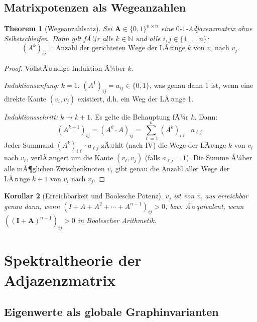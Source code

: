 ﻿\documentclass[12pt, a4paper]{article}
\newtheorem{theorem}{Theorem}[section]
\newtheorem{corollary}[theorem]{Korollar}
\theoremstyle{definition}
\theoremstyle{remark}
\newcommand{\N}{\mathbb{N}}
\newcommand{\vA}{\bm{A}}
\newcommand{\vI}{\bm{I}}
\begin{document}
\subsection{Matrixpotenzen als Wegeanzahlen}
\label{subsec:potenzen}

\begin{theorem}[Wegeanzahlsatz]
\label{thm:wege}
Sei $\vA \in \{0,1\}^{n \times n}$ eine $0$-$1$-Adjazenzmatrix ohne
Selbstschleifen. Dann gilt fÃ¼r alle $k \in \N$ und alle $i,j \in
\{1,\ldots,n\}$:
\[
  (A^k)_{ij} = \text{Anzahl der gerichteten Wege der LÃ¤nge } k
  \text{ von } v_i \text{ nach } v_j.
\]
\end{theorem}

\begin{proof}
VollstÃ¤ndige Induktion Ã¼ber $k$.

\emph{Induktionsanfang:} $k=1$. $(A^1)_{ij} = a_{ij} \in \{0,1\}$, was
genau dann $1$ ist, wenn eine direkte Kante $(v_i, v_j)$ existiert, d.h.
ein Weg der LÃ¤nge 1.

\emph{Induktionsschritt:} $k \to k+1$. Es gelte die Behauptung fÃ¼r $k$.
Dann:
\[
  (A^{k+1})_{ij} = (A^k \cdot A)_{ij} = \sum_{\ell=1}^n (A^k)_{i\ell} \cdot a_{\ell j}.
\]
Jeder Summand $(A^k)_{i\ell} \cdot a_{\ell j}$ zÃ¤hlt (nach IV) die Wege
der LÃ¤nge $k$ von $v_i$ nach $v_\ell$, verlÃ¤ngert um die Kante
$(v_\ell, v_j)$ (falls $a_{\ell j} = 1$). Die Summe Ã¼ber alle mÃ¶glichen
Zwischenknoten $v_\ell$ gibt genau die Anzahl aller Wege der LÃ¤nge $k+1$
von $v_i$ nach $v_j$.
\end{proof}

\begin{corollary}[Erreichbarkeit und Boolesche Potenz]
\label{cor:erreich}
$v_j$ ist von $v_i$ aus erreichbar genau dann, wenn
$(I + A + A^2 + \cdots + A^{n-1})_{ij} > 0$,
bzw. Ã¤quivalent, wenn $((\vI + \vA)^{n-1})_{ij} > 0$ in Boolescher Arithmetik.
\end{corollary}

\section{Spektraltheorie der Adjazenzmatrix}
\label{sec:spektral}

\subsection{Eigenwerte als globale Graphinvarianten}
\label{subsec:eigenwerte}
\end{document}
